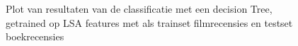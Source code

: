 \begin{figure}%
    \centering
    \caption{Plot van resultaten van de classificatie met een decision Tree, getrained op LSA features met als trainset filmrecensies en testset boekrecensies}
    \label{fig:example}%
\end{figure}
%  


